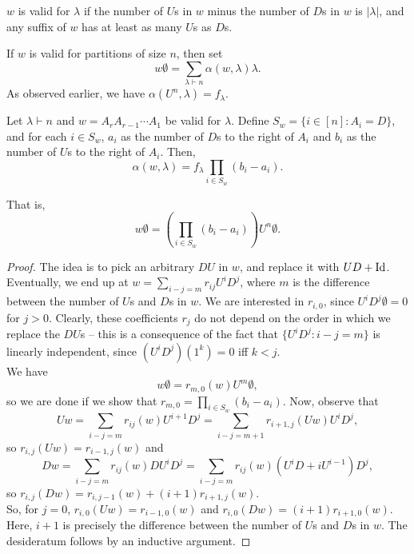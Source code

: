 \begin{fprop}
	$w$ is valid for $\lambda$ if the number of $U$s in $w$ minus the number of $D$s in $w$ is $|\lambda|$, and any suffix of $w$ has at least as many $U$s as $D$s.
\end{fprop}

If $w$ is valid for partitions of size $n$, then set
\[ w\emptyset = \sum_{\lambda \vdash n} \alpha(w,\lambda) \lambda. \]
As observed earlier, we have $\alpha(U^n,\lambda) = f_\lambda$.

\begin{ftheo}
	Let $\lambda \vdash n$ and $w = A_r A_{r-1} \cdots A_1$ be valid for $\lambda$. Define $S_w = \{i \in [n] : A_i = D\}$, and for each $i \in S_w$, $a_i$ as the number of $D$s to the right of $A_i$ and $b_i$ as the number of $U$s to the right of $A_i$. Then,
	\[ \alpha(w,\lambda) = f_\lambda \prod_{i \in S_w} (b_i - a_i).  \]
\end{ftheo}
That is,
\[ w\emptyset = \left(\prod_{i \in S_w} (b_i - a_i)\right) U^n\emptyset. \]
\begin{proof}
	The idea is to pick an arbitrary $DU$ in $w$, and replace it with $UD + \operatorname{Id}$. Eventually, we end up at $w = \sum_{i-j=m} r_{ij} U^i D^j$, where $m$ is the difference between the number of $U$s and $D$s in $w$. We are interested in $r_{i,0}$, since $U^iD^j \emptyset = 0$ for $j > 0$. Clearly, these coefficients $r_j$ do not depend on the order in which we replace the $DU$s -- this is a consequence of the fact that $\{U^iD^j : i-j = m\}$ is linearly independent, since $(U^iD^j)(1^k) = 0$ iff $k < j$.\\
	We have
	\[ w\emptyset = r_{m,0} (w) U^m \emptyset, \]
	so we are done if we show that $r_{m,0} = \prod_{i \in S_w} (b_i - a_i)$.
	Now, observe that
	\[ Uw = \sum_{i-j = m} r_{ij}(w)U^{i+1}D^j = \sum_{i-j=m+1} r_{i+1,j}(Uw) U^{i} D^j, \]
	so $r_{i,j}(Uw) = r_{i-1,j}(w)$ and
	\[ Dw = \sum_{i-j = m} r_{ij}(w) DU^{i}D^j = \sum_{i-j = m} r_{ij}(w) (U^iD + iU^{i-1}) D^j, \]
	so $r_{i,j}(Dw) = r_{i,j-1}(w) + (i+1) r_{i+1,j}(w)$.\\
	So, for $j = 0$, $r_{i,0}(Uw) = r_{i-1,0}(w)$ and $r_{i,0}(Dw) = (i+1) r_{i+1,0}(w)$. Here, $i+1$ is precisely the difference between the number of $U$s and $D$s in $w$. The desideratum follows by an inductive argument.
\end{proof}

